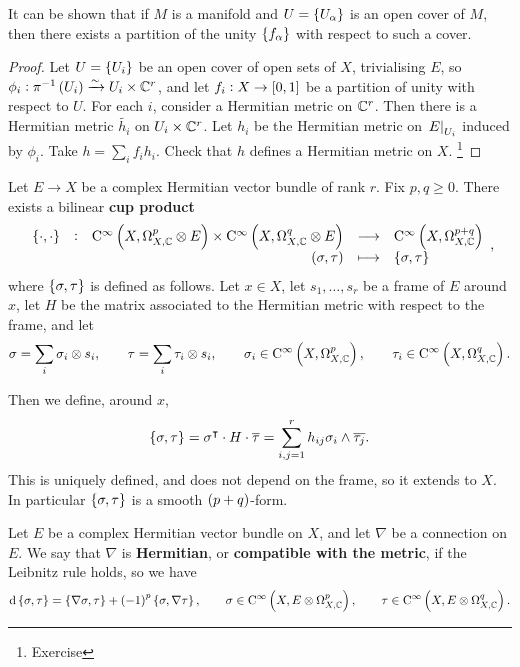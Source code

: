 It can be shown that if $ M $ is a manifold and $ U = \cbr{U_\alpha} $ is an open cover of $ M $, then there exists a partition of the unity $ \cbr{f_\alpha} $ with respect to such a cover.

\begin{proof}
Let $ U = \cbr{U_i} $ be an open cover of open sets of $ X $, trivialising $ E $, so $ \phi_i : \pi^{-1}\br{U_i} \xrightarrow{\sim} U_i \times \CC^r $, and let $ f_i : X \to \sbr{0, 1} $ be a partition of unity with respect to $ U $. For each $ i $, consider a Hermitian metric on $ \mathbb{C}^r $. Then there is a Hermitian metric $ \widetilde{h_i} $ on $ U_i \times \mathbb{C}^r $. Let $ h_i $ be the Hermitian metric on $ \left. E \right|_{U_i} $ induced by $ \phi_i $. Take $ h = \sum_i f_ih_i $. Check that $ h $ defines a Hermitian metric on $ X $. \footnote{Exercise}
\end{proof}


Let $ E \to X $ be a complex Hermitian vector bundle of rank $ r $. Fix $ p, q \ge 0 $. There exists a bilinear \textbf{cup product}
$$ \function[\cbr{\cdot, \cdot}]{\C^\infty\br{X, \Omega_{X, \CC}^p \otimes E} \times \C^\infty\br{X, \Omega_{X, \CC}^q \otimes E}}{\C^\infty\br{X, \Omega_{X, \CC}^{p + q}}}{\br{\sigma, \tau}}{\cbr{\sigma, \tau}}, $$
where $ \cbr{\sigma, \tau} $ is defined as follows. Let $ x \in X $, let $ s_1, \dots, s_r $ be a frame of $ E $ around $ x $, let $ H $ be the matrix associated to the Hermitian metric with respect to the frame, and let
$$ \sigma = \sum_i \sigma_i \otimes s_i, \qquad \tau = \sum_i \tau_i \otimes s_i, \qquad \sigma_i \in \C^\infty\br{X, \Omega_{X, \CC}^p}, \qquad \tau_i \in \C^\infty\br{X, \Omega_{X, \CC}^q}. $$

\pagebreak

Then we define, around $ x $,
$$ \cbr{\sigma, \tau} = \sigma^\intercal \cdot H \cdot \overline{\tau} = \sum_{i, j = 1}^r h_{ij}\sigma_i \wedge \overline{\tau_j}. $$
This is uniquely defined, and does not depend on the frame, so it extends to $ X $. In particular $ \cbr{\sigma, \tau} $ is a smooth $ \br{p + q} $-form.

\begin{definition}
Let $ E $ be a complex Hermitian vector bundle on $ X $, and let $ \nabla $ be a connection on $ E $. We say that $ \nabla $ is \textbf{Hermitian}, or \textbf{compatible with the metric}, if the Leibnitz rule holds, so we have
$$ \d\cbr{\sigma, \tau} = \cbr{\nabla\sigma, \tau} + \br{-1}^p\cbr{\sigma, \nabla\tau}, \qquad \sigma \in \C^\infty\br{X, E \otimes \Omega_{X, \CC}^p}, \qquad \tau \in \C^\infty\br{X, E \otimes \Omega_{X, \CC}^q}. $$
\end{definition}

